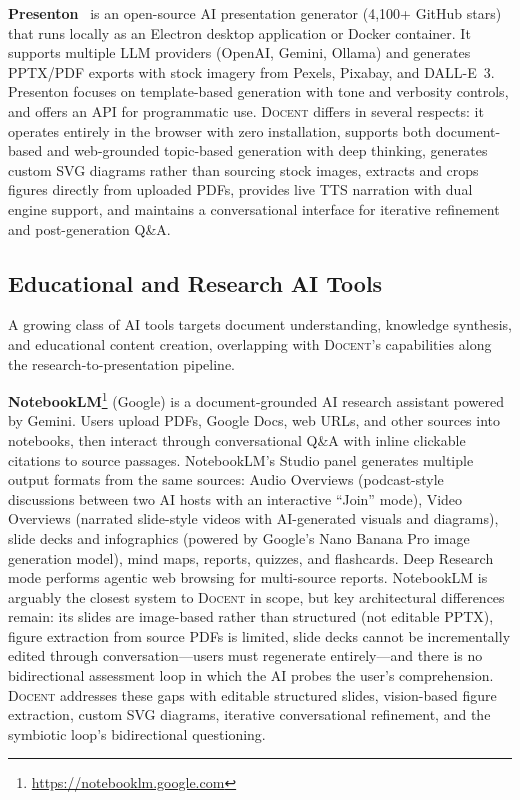 \documentclass[11pt,a4paper]{article}
\newcommand{\system}{\textsc{Docent}\xspace}
\begin{document}
\textbf{Presenton}~\citep{presenton2025} is an open-source AI presentation generator (4,100+ GitHub stars) that runs locally as an Electron desktop application or Docker container.
It supports multiple LLM providers (OpenAI, Gemini, Ollama) and generates PPTX/PDF exports with stock imagery from Pexels, Pixabay, and DALL-E~3.
Presenton focuses on template-based generation with tone and verbosity controls, and offers an API for programmatic use.
\system differs in several respects: it operates entirely in the browser with zero installation, supports both document-based and web-grounded topic-based generation with deep thinking, generates custom SVG diagrams rather than sourcing stock images, extracts and crops figures directly from uploaded PDFs, provides live TTS narration with dual engine support, and maintains a conversational interface for iterative refinement and post-generation Q\&A.

\subsection{Educational and Research AI Tools}
\label{sec:related-eduresearch}

A growing class of AI tools targets document understanding, knowledge synthesis, and educational content creation, overlapping with \system's capabilities along the research-to-presentation pipeline.

\textbf{NotebookLM}\footnote{\url{https://notebooklm.google.com}} (Google) is a document-grounded AI research assistant powered by Gemini.
Users upload PDFs, Google Docs, web URLs, and other sources into notebooks, then interact through conversational Q\&A with inline clickable citations to source passages.
NotebookLM's Studio panel generates multiple output formats from the same sources: Audio Overviews (podcast-style discussions between two AI hosts with an interactive ``Join'' mode), Video Overviews (narrated slide-style videos with AI-generated visuals and diagrams), slide decks and infographics (powered by Google's Nano Banana Pro image generation model), mind maps, reports, quizzes, and flashcards.
Deep Research mode performs agentic web browsing for multi-source reports.
NotebookLM is arguably the closest system to \system in scope, but key architectural differences remain: its slides are image-based rather than structured (not editable PPTX), figure extraction from source PDFs is limited, slide decks cannot be incrementally edited through conversation---users must regenerate entirely---and there is no bidirectional assessment loop in which the AI probes the user's comprehension.
\system addresses these gaps with editable structured slides, vision-based figure extraction, custom SVG diagrams, iterative conversational refinement, and the symbiotic loop's bidirectional questioning.
\end{document}
